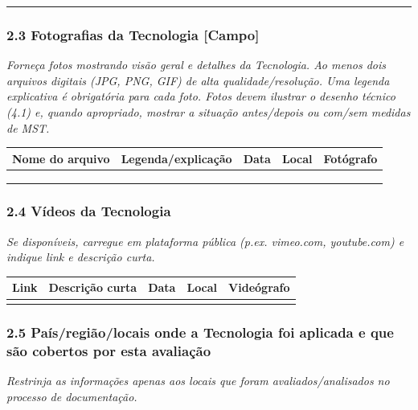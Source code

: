 \begin{center}\rule{0.5\linewidth}{0.5pt}\end{center}

\subsubsection{2.3 Fotografias da Tecnologia {[Campo]}}\label{fotografias-da-tecnologia}

\emph{Forneça fotos mostrando visão geral e detalhes da Tecnologia. Ao menos dois arquivos digitais (JPG, PNG, GIF) de alta qualidade/resolução. Uma legenda explicativa é obrigatória para cada foto. Fotos devem ilustrar o desenho técnico (4.1) e, quando apropriado, mostrar a situação antes/depois ou com/sem medidas de MST.}

{
\begin{longtable}[]{@{}lllll@{}}
\toprule\noalign{}
Nome do arquivo & Legenda/explicação & Data & Local & Fotógrafo \\
\midrule\noalign{}
\endhead
\bottomrule\noalign{}
\endlastfoot
& & & & \\
& & & & \\
& & & & \\
\end{longtable}
}

\subsubsection{2.4 Vídeos da Tecnologia}\label{vuxeddeos-da-tecnologia}

\emph{Se disponíveis, carregue em plataforma pública (p.ex. vimeo.com, youtube.com) e indique link e descrição curta.}

{
\begin{longtable}[]{@{}lllll@{}}
\toprule\noalign{}
Link & Descrição curta & Data & Local & Videógrafo \\
\midrule\noalign{}
\endhead
\bottomrule\noalign{}
\endlastfoot
& & & & \\
\end{longtable}
}

\subsubsection{2.5 País/região/locais onde a Tecnologia foi aplicada e que são cobertos por esta avaliação}\label{pauxedsregiuxe3olocais-onde-a-tecnologia-foi-aplicada-e-que-suxe3o-cobertos-por-esta-avaliauxe7uxe3o}

\emph{Restrinja as informações apenas aos locais que foram avaliados/analisados no processo de documentação.}

